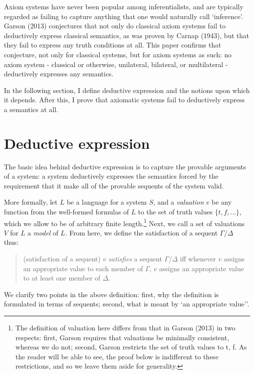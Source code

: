 \documentclass[]{article}
\begin{document}
Axiom systems have never been popular among inferentialists, and are typically regarded as failing to capture anything that one would naturally call `inference'. Garson (2013) conjectures that not only do classical axiom systems fail to deductively express classical semantics, as was proven by Carnap (1943), but that they fail to express any truth conditions at all. This paper confirms that conjecture, not only for classical systems, but for axiom systems as such: no axiom system - classical or otherwise, unilateral, bilateral, or multilateral - deductively expresses any semantics. 

In the following section, I define deductive expression and the notions upon which it depends. After this, I prove that axiomatic systems fail to deductively express a semantics at all.

\section{Deductive expression}
The basic idea behind deductive expression is to capture the provable arguments of a system: a system deductively expresses the semantics forced by the requirement that it make all of the provable sequents of the system valid. 

More formally, let $L$ be a language for a system $S$, and a \textit{valuation} $v$ be any function from the well-formed formulas of $L$ to the set of truth values $\{t, f, ...\}$, which we allow to be of arbitrary finite length.\footnote{The definition of valuation here differs from that in Garson (2013) in two respects: first, Garson requires that valuations be minimally consistent, whereas we do not; second, Garson restricts the set of truth values to {t, f}. As the reader will be able to see, the proof below is indifferent to these restrictions, and so we leave them aside for generality.} Next, we call a set of valuations $V$ for $L$ a \textit{model} of $L$. From here, we define the satisfaction of a sequent $\Gamma / \Delta$ thus:

\begin{quote}
(satisfaction of a sequent) $v$ \textit{satisfies} a sequent $\Gamma / \Delta$ iff whenever $v$ assigns an appropriate value to each member of $\Gamma$, $v$ assigns an appropriate value to at least one member of $\Delta$.
\end{quote}

We clarify two points in the above definition: first, why the definition is formulated in terms of sequents; second, what is meant by `an appropriate value''. 
\end{document}
